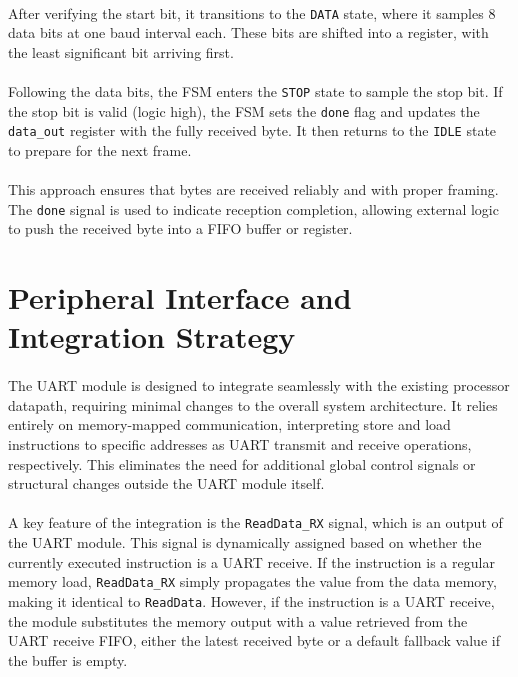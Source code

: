 \documentclass[12pt]{report}
\begin{document}
\paragraph{}
After verifying the start bit, it transitions to the \texttt{DATA} state, where it samples 8 data bits at one baud interval each. These bits are shifted into a register, with the least significant bit arriving first.

\paragraph{}
Following the data bits, the FSM enters the \texttt{STOP} state to sample the stop bit. If the stop bit is valid (logic high), the FSM sets the \texttt{done} flag and updates the \texttt{data\_out} register with the fully received byte. It then returns to the \texttt{IDLE} state to prepare for the next frame.

\paragraph{}
This approach ensures that bytes are received reliably and with proper framing. The \texttt{done} signal is used to indicate reception completion, allowing external logic to push the received byte into a FIFO buffer or register.

\section{Peripheral Interface and Integration Strategy}

\paragraph{}
The UART module is designed to integrate seamlessly with the existing processor datapath, requiring minimal changes to the overall system architecture. It relies entirely on memory-mapped communication, interpreting store and load instructions to specific addresses as UART transmit and receive operations, respectively. This eliminates the need for additional global control signals or structural changes outside the UART module itself.

\paragraph{}
A key feature of the integration is the \texttt{ReadData\_RX} signal, which is an output of the UART module. This signal is dynamically assigned based on whether the currently executed instruction is a UART receive. If the instruction is a regular memory load, \texttt{ReadData\_RX} simply propagates the value from the data memory, making it identical to \texttt{ReadData}. However, if the instruction is a UART receive, the module substitutes the memory output with a value retrieved from the UART receive FIFO, either the latest received byte or a default fallback value if the buffer is empty.
\end{document}
